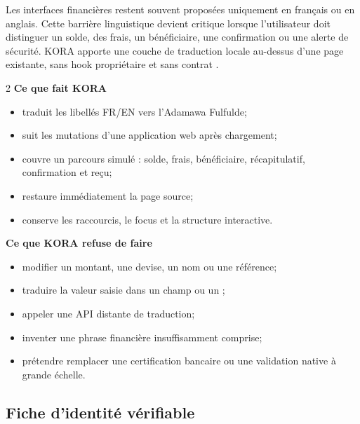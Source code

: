 Les interfaces financières restent souvent proposées uniquement en français
ou en anglais. Cette barrière linguistique devient critique lorsque
l’utilisateur doit distinguer un solde, des frais, un bénéficiaire, une
confirmation ou une alerte de sécurité. KORA apporte une couche de traduction
locale au-dessus d’une page existante, sans hook propriétaire et sans contrat
.

\begin{multicols}{2}
\textbf{Ce que fait KORA}
\begin{itemize}
  \item traduit les libellés FR/EN vers l’Adamawa Fulfulde;
  \item suit les mutations d’une application web après chargement;
  \item couvre un parcours simulé : solde, frais, bénéficiaire,
        récapitulatif, confirmation et reçu;
  \item restaure immédiatement la page source;
  \item conserve les raccourcis, le focus et la structure interactive.
\end{itemize}

\columnbreak
\textbf{Ce que KORA refuse de faire}
\begin{itemize}
  \item modifier un montant, une devise, un nom ou une référence;
  \item traduire la valeur saisie dans un champ ou un ;
  \item appeler une API distante de traduction;
  \item inventer une phrase financière insuffisamment comprise;
  \item prétendre remplacer une certification bancaire ou une validation
        native à grande échelle.
\end{itemize}
\end{multicols}

\subsection*{Fiche d’identité vérifiable}

